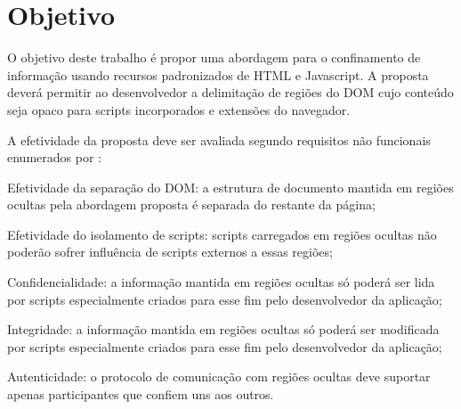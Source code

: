 \section{Objetivo}



O objetivo deste trabalho é propor uma abordagem para o confinamento de informação usando recursos padronizados de HTML e Javascript. A proposta deverá permitir ao desenvolvedor a delimitação de regiões do DOM cujo conteúdo seja opaco para scripts incorporados e extensões do navegador.

A efetividade da proposta deve ser avaliada segundo requisitos não funcionais enumerados por \cite{DeRyck2012}:

\begin{alineas}
	\item Efetividade da separação do DOM: a estrutura de documento mantida em regiões ocultas pela abordagem proposta é separada do restante da página;
	\item Efetividade do isolamento de scripts: scripts carregados em regiões ocultas não poderão sofrer influência de scripts externos a essas regiões;
	\item Confidencialidade: a informação mantida em regiões ocultas só poderá ser lida por scripts especialmente criados para esse fim pelo desenvolvedor da aplicação;
	\item Integridade: a informação mantida em regiões ocultas só poderá ser modificada por scripts especialmente criados para esse fim pelo desenvolvedor da aplicação;
	\item Autenticidade: o protocolo de comunicação com regiões ocultas deve suportar apenas participantes que confiem uns aos outros.
\end{alineas}

